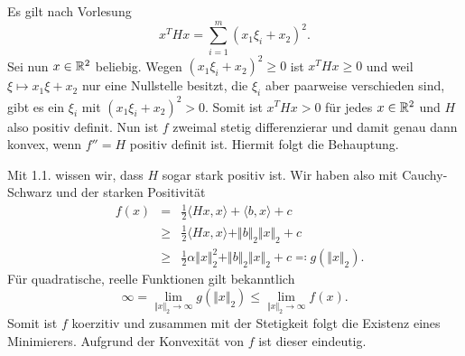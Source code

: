 
\begin{compactenum}[(i)]
 \item Es gilt nach Vorlesung
 \begin{displaymath}
  x^THx=\sum_{i=1}^m(x_1\xi_i+x_2)^2.
 \end{displaymath}
 Sei nun $x\in\mathbb{R}^2$ beliebig. Wegen $(x_1\xi_i+x_2)^2\geq0$ ist $x^THx\geq0$ und weil $\xi\mapsto x_1\xi+x_2$ nur eine Nullstelle besitzt, die $\xi_i$ aber
 paarweise verschieden sind, gibt es ein $\xi_i$ mit $(x_1\xi_i+x_2)^2>0$. Somit ist $x^THx>0$ für jedes $x\in\mathbb{R}^2$ und $H$ also positiv definit.
 Nun ist $f$ zweimal stetig differenzierar und damit genau dann konvex, wenn $f''=H$ positiv definit ist. Hiermit folgt die Behauptung.
 \\
 \item Mit 1.1. wissen wir, dass $H$ sogar stark positiv ist. Wir haben also mit Cauchy-Schwarz und der starken Positivität
 \begin{align*}
  &f(x)&=&\frac{1}{2}\langle Hx,x\rangle+\langle b, x\rangle+c\\
  &&\geq&\frac{1}{2}\langle Hx,x\rangle+\Vert b\Vert_2\Vert x\Vert_2+c\\
  &&\geq&\frac{1}{2}\alpha\Vert x\Vert_2^2+\Vert b\Vert_2\Vert x\Vert_2+c \eqqcolon g(\Vert x\Vert_2).
 \end{align*}
 Für quadratische, reelle Funktionen gilt bekanntlich
 \begin{displaymath}
  \infty=\lim_{\Vert x\Vert_2\to\infty}g(\Vert x\Vert_2)\leq \lim_{\Vert x\Vert_2\to\infty} f(x).
 \end{displaymath}
 Somit ist $f$ koerzitiv und zusammen mit der Stetigkeit folgt die Existenz eines Minimierers. Aufgrund der Konvexität von $f$ ist dieser eindeutig.

\end{compactenum}
